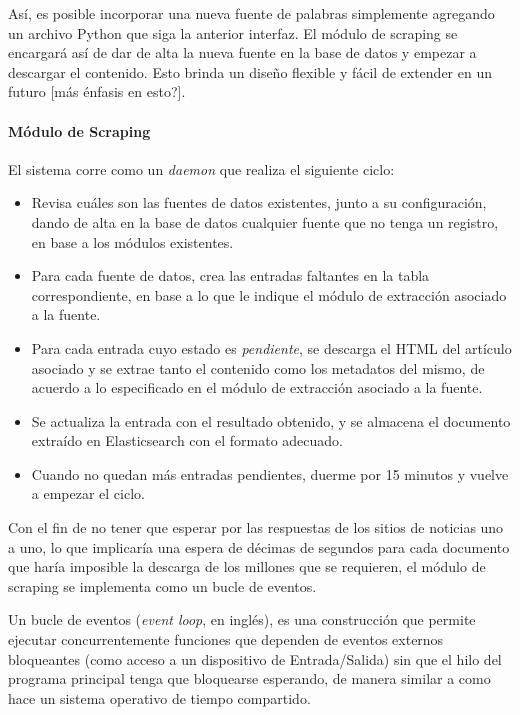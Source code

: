 Así, es posible incorporar una nueva fuente de palabras simplemente agregando un archivo Python que
siga la anterior interfaz. El módulo de scraping se encargará así de dar de alta la nueva fuente en
la base de datos y empezar a descargar el contenido. Esto brinda un diseño flexible y fácil de
extender en un futuro [más énfasis en esto?].


\paragraph{Módulo de Scraping}

El sistema corre como un \textit{daemon} que realiza el siguiente ciclo:

\begin{itemize}

\item Revisa cuáles son las fuentes de datos existentes, junto a su configuración, dando de alta en
la base de datos cualquier fuente que no tenga un registro, en base a los módulos existentes.

\item Para cada fuente de datos, crea las entradas faltantes en la tabla correspondiente, en base a
lo que le indique el módulo de extracción asociado a la fuente.

\item Para cada entrada cuyo estado es \textit{pendiente}, se descarga el HTML del artículo asociado
y se extrae tanto el contenido como los metadatos del mismo, de acuerdo a lo especificado en el
módulo de extracción asociado a la fuente.

\item Se actualiza la entrada con el resultado obtenido, y se almacena el documento extraído en
Elasticsearch con el formato adecuado.

\item Cuando no quedan más entradas pendientes, duerme por 15 minutos y vuelve a empezar el ciclo.

\end{itemize}

Con el fin de no tener que esperar por las respuestas de los sitios de noticias uno a uno, lo que
implicaría una espera de décimas de segundos para cada documento que haría imposible la descarga de
los millones que se requieren, el módulo de scraping se implementa como un bucle de eventos.

Un bucle de eventos (\textit{event loop}, en inglés), es una construcción que permite ejecutar
concurrentemente funciones que dependen de eventos externos bloqueantes (como acceso a un
dispositivo de Entrada/Salida) sin que el hilo del programa principal tenga que bloquearse
esperando, de manera similar a como hace un sistema operativo de tiempo compartido.

